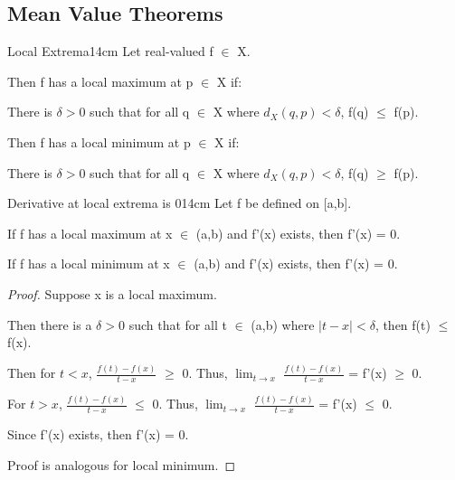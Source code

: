     \vspace{0.5cm}





\subsection{ Mean Value Theorems}

    \begin{definition}{Local Extrema}{14cm}
        Let real-valued f $\in$ X.
        
        Then f has a local maximum at p $\in$ X if:
        
        \hspace{0.5cm}
        There is $\delta > 0$ such that for all q $\in$ X where $d_X(q,p) < \delta$,
        f(q) $\leq$ f(p).
        
        Then f has a local minimum at p $\in$ X if:

        \hspace{0.5cm}
        There is $\delta > 0$ such that for all q $\in$ X where $d_X(q,p) < \delta$,
        f(q) $\geq$ f(p).
    \end{definition}

    \vspace{0.5cm}



    \begin{wtheorem}{Derivative at local extrema is 0}{14cm}
        Let f be defined on [a,b].
        
        If f has a local maximum at x $\in$ (a,b) and f'(x) exists, then
        f'(x) = 0.

        If f has a local minimum at x $\in$ (a,b) and f'(x) exists, then
        f'(x) = 0.
    \end{wtheorem}

    \begin{proof}
        Suppose x is a local maximum.
        
        Then there is a $\delta > 0$ such that for all t $\in$ (a,b)
        where $|t - x| < \delta$, then f(t) $\leq$ f(x).

        Then for $t < x$, $\frac{f(t) - f(x)}{t - x}$ $\geq$ 0.
        Thus, $\lim_{t \rightarrow x}$ $\frac{f(t) - f(x)}{t - x}$ = f'(x) $\geq$ 0. 

        For $t > x$, $\frac{f(t) - f(x)}{t - x}$ $\leq$ 0.
        Thus, $\lim_{t \rightarrow x}$ $\frac{f(t) - f(x)}{t - x}$ = f'(x) $\leq$ 0.

        Since f'(x) exists, then f'(x) = 0.

        Proof is analogous for local minimum.
    \end{proof}

